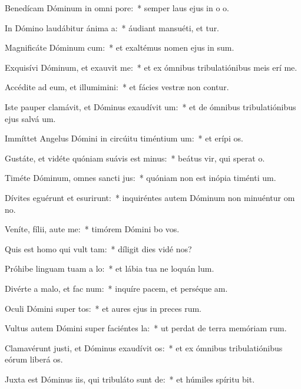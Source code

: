 \item Benedícam Dóminum in omni pore:~* semper laus ejus in o o.
\item In Dómino laudábitur ánima a:~* áudiant mansuéti, et tur.
\item Magnificáte Dóminum cum:~* et exaltémus nomen ejus in sum.
\item Exquisívi Dóminum, et exauvit me:~* et ex ómnibus tribulatiónibus meis erí me.
\item Accédite ad eum, et illumimini:~* et fácies vestræ non contur.
\item Iste pauper clamávit, et Dóminus exaudívit um:~* et de ómnibus tribulatiónibus ejus salvá um.
\item Immíttet Angelus Dómini in circúitu timéntium um:~* et erípi os.
\item Gustáte, et vidéte quóniam suávis est minus:~* beátus vir, qui sperat  o.
\item Timéte Dóminum, omnes sancti jus:~* quóniam non est inópia timénti um.
\item Dívites eguérunt et esurirunt:~* inquiréntes autem Dóminum non minuéntur om no.
\item Veníte, fílii, aute me:~* timórem Dómini bo vos.
\item Quis est homo qui vult tam:~* díligit dies vidé nos?
\item Próhibe linguam tuam a lo:~* et lábia tua ne loquán lum.
\item Divérte a malo, et fac num:~* inquíre pacem, et perséque am.
\item Oculi Dómini super tos:~* et aures ejus in preces rum.
\item Vultus autem Dómini super faciéntes la:~* ut perdat de terra memóriam rum.
\item Clamavérunt justi, et Dóminus exaudívit os:~* et ex ómnibus tribulatiónibus eórum liberá os.
\item Juxta est Dóminus iis, qui tribuláto sunt de:~* et húmiles spíritu bit.
